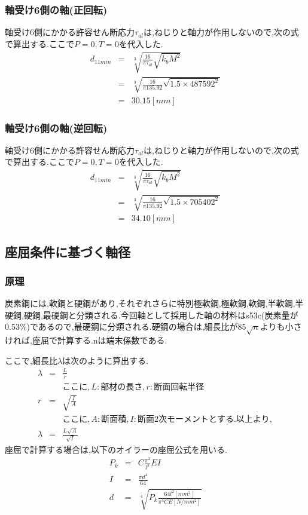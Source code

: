 \subsubsection{軸受け6側の軸(正回転)}
軸受け6側にかかる許容せん断応力$\tau_{al}$は,ねじりと軸力が作用しないので,次の式で算出する.ここで$P=0,T=0$を代入した.
\begin{eqnarray}
d_{11min} &=& \sqrt [3]{ \frac{16}{\pi \tau_{al}}\sqrt{k_bM^2} }\\
       &=& \sqrt [3]{ \frac{16}{\pi 135.92}\sqrt{1.5 \times 487592^2} }\\
       &=& 30.15[mm]
\end{eqnarray}
\subsubsection{軸受け6側の軸(逆回転)}
軸受け6側にかかる許容せん断応力$\tau_{al}$は,ねじりと軸力が作用しないので,次の式で算出する.ここで$P=0,T=0$を代入した.
\begin{eqnarray}
d_{11min} &=& \sqrt [3]{ \frac{16}{\pi \tau_{al}}\sqrt{k_bM^2} }\\
       &=& \sqrt [3]{ \frac{16}{\pi 135.92}\sqrt{1.5 \times 705402^2} }\\
       &=& 34.10[mm]
\end{eqnarray}

\subsection{座屈条件に基づく軸径}
\subsubsection{原理}
炭素鋼には,軟鋼と硬鋼があり,それぞれさらに特別極軟鋼,極軟鋼,軟鋼,半軟鋼,半硬鋼,硬鋼,最硬鋼と分類される.今回軸として採用した軸の材料はs53c(炭素量が0.53\%)であるので,最硬鋼に分類される.硬鋼の場合は,細長比が$85 \sqrt n$よりも小さければ,座屈で計算する.nは端末係数である.\\
\par
ここで,細長比$\lambda$は次のように算出する.
\begin{eqnarray}
\lambda &=& \frac{L}{r}\\
&&ここに,L:部材の長さ,r:断面回転半径\\
r&=&\sqrt{\frac{I}{A}}\\
&&ここに,A:断面積,I:断面2次モーメントとする.以上より,\\
\lambda &=& \frac{L\sqrt{A}}{\sqrt{I}}
\end{eqnarray}
座屈で計算する場合は,以下のオイラーの座屈公式を用いる.
\begin{eqnarray}
P_k &=& C\frac{\pi^2}{l^2}EI\\
I&=&\frac{\pi d^4}{64}\\
d&=&\sqrt[4]{P_k\frac{64l^2[mm^2]}{\pi^3CE[N/mm^2]}}
\end{eqnarray}
